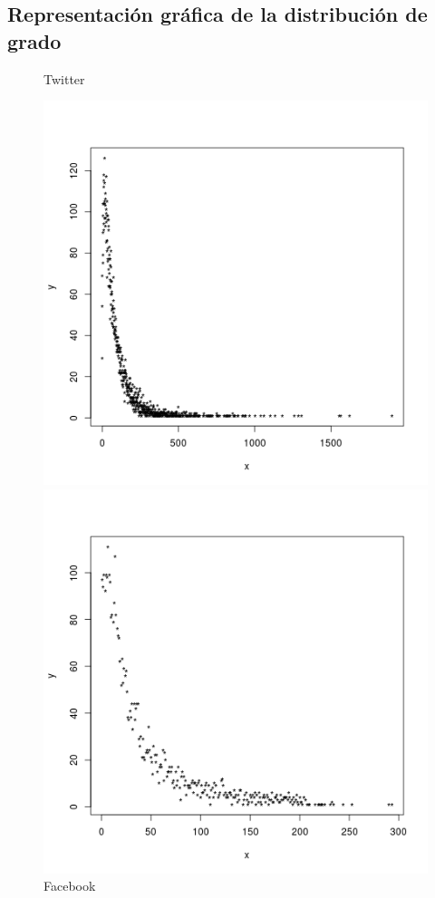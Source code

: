 \documentclass[palatino]{apuntes}
\begin{document}
\newpage
\subsection{Representación gráfica de la distribución de grado }



\begin{figure}[h!]
	\centering
	\begin{minipage}[b]{0.4\textwidth}
		\caption{Twitter}
		\includegraphics[scale=0.45]{img/twitter_grado}
	\end{minipage}
	\hfill
	\begin{minipage}[b]{0.4\textwidth}
		\caption{Facebook}
		\includegraphics[scale=0.45]{img/fb_grado}
	\end{minipage}
\end{figure}
\end{document}
